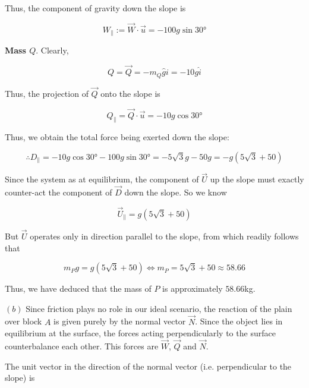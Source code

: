 \documentclass[12pt]{article}
\theoremstyle{definition}
\begin{document}
Thus, the component of gravity down the slope is 

\begin{equation}
    W_{\parallel}:= \vec{W} \cdot \vec{u} = -100g\sin \ang{30}
\end{equation}

\textbf{Mass $Q$}. Clearly, 

\begin{equation}
    Q = \vec{Q} = -m_Q\hat{g}i = -10g \hat{i}
\end{equation}

Thus, the projection of $\vec{Q}$ onto the slope is 

\begin{equation}
    Q_{\parallel} = \vec{Q} \cdot \vec{u} = -10g\cos\ang{30}
\end{equation}

Thus, we obtain the total force being exerted down the slope:

\begin{equation}
    \therefore D_{\parallel} = -10g\cos \ang{30} - 100g \sin\ang{30} =
    -5\sqrt{3}g - 50g = -g(5\sqrt{3} + 50 )
\end{equation}

Since the system as at equilibrium, the component of $\vec{U}$ up the slope must
exactly counter-act the component of $\vec{D}$ down the slope. So we know 

\begin{equation}
    \vec{U}_{\parallel} = g\left( 5\sqrt{3} + 50  \right) 
\end{equation}

But $\vec{U}$ operates only in direction parallel to the slope, from which
readily follows that 

\begin{equation}
    m_P g = g\left( 5\sqrt{3} + 50  \right) \iff m_P = 5\sqrt{3}  + 50 \approx
    58.66
\end{equation}

Thus, we have deduced that the mass of $P$ is approximately $58.66$kg.

$(b)$ Since friction plays no role in our ideal scenario, the reaction of the
plain over block $A$ is given purely by the normal vector $\vec{N}$. Since the
object lies in equilibrium at the surface, the forces acting perpendicularly to
the surface counterbalance each other. This forces are $\vec{W}$, $\vec{Q}$ and
$\vec{N}$. 

The unit vector in the direction of the normal vector (i.e. perpendicular to the
slope) is 
\end{document}
